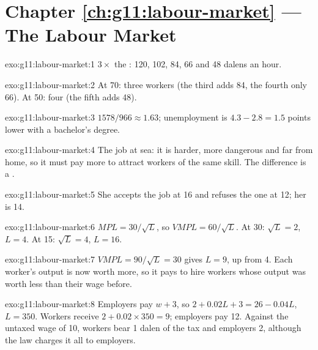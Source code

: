 \section*{Chapter \ref{ch:g11:labour-market} --- The Labour Market}

\begin{solution}{exo:g11:labour-market:1}
$3 \times$ the : 120, 102, 84, 66 and 48 dalens an hour.
\end{solution}

\begin{solution}{exo:g11:labour-market:2}
At 70: three workers (the third adds 84, the fourth only 66). At 50: four (the fifth adds 48).
\end{solution}

\begin{solution}{exo:g11:labour-market:3}
$1578/966 \approx 1.63$; unemployment is $4.3 - 2.8 = 1.5$ points lower with a bachelor's degree.
\end{solution}

\begin{solution}{exo:g11:labour-market:4}
The job at sea: it is harder, more dangerous and far from home, so it must pay more to attract workers of the same skill. The difference is a .
\end{solution}

\begin{solution}{exo:g11:labour-market:5}
She accepts the job at 16 and refuses the one at 12; her  is 14.
\end{solution}

\begin{solution}{exo:g11:labour-market:6}
$\mathit{MPL} = 30/\sqrt{L}$, so $\mathit{VMPL} = 60/\sqrt{L}$. At 30: $\sqrt{L} = 2$, $L = 4$. At 15: $\sqrt{L} = 4$, $L = 16$.
\end{solution}

\begin{solution}{exo:g11:labour-market:7}
$\mathit{VMPL} = 90/\sqrt{L} = 30$ gives $L = 9$, up from 4. Each worker's output is now worth more, so it pays to hire workers whose output was worth less than their
wage before.
\end{solution}

\begin{solution}{exo:g11:labour-market:8}
Employers pay $w + 3$, so $2 + 0.02L + 3 = 26 - 0.04L$, $L = 350$. Workers receive $2 + 0.02 \times 350 = 9$; employers pay 12. Against the untaxed wage of 10, workers bear
1 dalen of the tax and employers 2, although the law charges it all to employers.
\end{solution}

